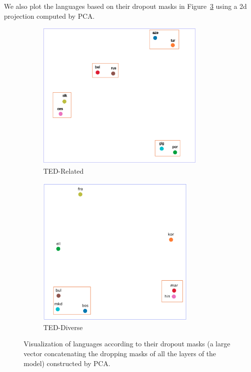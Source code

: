\documentclass[11pt]{article}
\begin{document}
We also plot the languages based on their dropout masks in Figure~\ref{fig:visual} using a 2d projection computed by PCA.
\begin{figure}[htbp]
\begin{subfigure}{0.5\textwidth}
  \centering
  \includegraphics[width=0.9\textwidth]{ted_related}  
  \caption{TED-Related}
  \label{fig:visual-related}
\end{subfigure}
\begin{subfigure}{0.5\textwidth}
  \centering
  \includegraphics[width=0.85\textwidth]{ted_diverse}  
  \caption{TED-Diverse}
  \label{fig:visual-diverse}
\end{subfigure}
\caption{Visualization of languages according to their dropout masks (a large vector concatenating the dropping masks of all the layers of the model) constructed by PCA.}
\label{fig:visual}
\end{figure}
\end{document}

